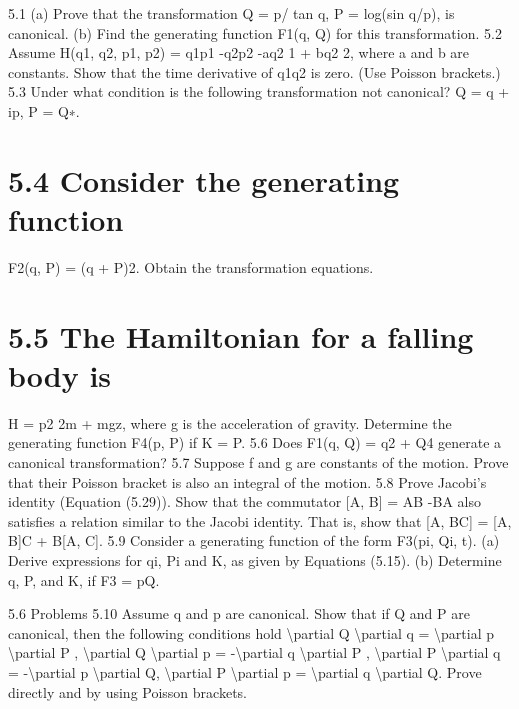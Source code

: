 5.1 (a) Prove that the transformation
Q = p/ tan q,
P = log(sin q/p),
is canonical. (b) Find the generating function F1(q, Q) for this transformation.
5.2 Assume H(q1, q2, p1, p2) = q1p1 -q2p2 -aq2
1 + bq2
2, where a and b
are constants. Show that the time derivative of q1q2 is zero. (Use Poisson
brackets.)
5.3 Under what condition is the following transformation not canonical?
Q = q + ip,
P = Q∗.
\section*{5.4  Consider the generating function}

F2(q, P) = (q + P)2.
Obtain the transformation equations.
\section*{5.5  The Hamiltonian for a falling body is}

H = p2
2m + mgz,
where g is the acceleration of gravity. Determine the generating function
F4(p, P) if K = P.
5.6 Does F1(q, Q) = q2 + Q4 generate a canonical transformation?
5.7 Suppose f and g are constants of the motion. Prove that their Poisson
bracket is also an integral of the motion.
5.8 Prove Jacobi's identity (Equation (5.29)). Show that the commutator
[A, B] = AB -BA also satisfies a relation similar to the Jacobi identity. That is, show that [A, BC] = [A, B]C + B[A, C].
5.9 Consider a generating function of the form F3(pi, Qi, t). (a) Derive
expressions for qi, Pi and K, as given by Equations (5.15). (b) Determine
q, P, and K, if F3 = pQ.

5.6
Problems
5.10 Assume q and p are canonical. Show that if Q and P are canonical, then
the following conditions hold
\textbackslash{}partial Q
\textbackslash{}partial q = \textbackslash{}partial p
\textbackslash{}partial P , \textbackslash{}partial Q
\textbackslash{}partial p = -\textbackslash{}partial q
\textbackslash{}partial P , \textbackslash{}partial P
\textbackslash{}partial q = -\textbackslash{}partial p
\textbackslash{}partial Q, \textbackslash{}partial P
\textbackslash{}partial p = \textbackslash{}partial q
\textbackslash{}partial Q.
Prove directly and by using Poisson brackets.

